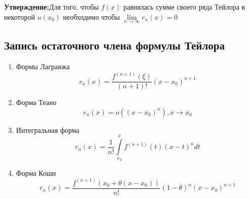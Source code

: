 \documentclass[12pt]{article}
\let\oldint\int
\let\oldlim\lim
\renewcommand{\int}{\oldint\limits}
\renewcommand{\lim}{\oldlim\limits}
\begin{document}
    \textbf{Утверждение:}Для того, чтобы $f(x)$ равнялась сумме своего ряда Тейлора в некоторой
    $u(x_0)$ необходимо чтобы $\lim_{n \to \infty}r_n(x)=0$

    \subsection*{Запись остаточного члена формулы Тейлора}
    \begin{enumerate}
      \item Формы Лагранжа
      \[r_n(x)=\frac{f^{(n+1)}(\xi)}{(n+1)!}(x-x_0)^{n+1}\]
      \item Форма Теано
      \[r_n(x)=o((x-x_0)^n), x \to x_0\]
      \item Интегральная форма
      \[r_n(x)=\frac{1}{n!}\int_{x_0}^{x}f^{(n+1)}(t)(x-t)^ndt\]
      \item Форма Коши
      \[r_n(x)=\dfrac{f^{(n+1)}(x_0+\theta(x-x_0))}{n!}(1-\theta)^n(x-x_0)^{n+1}\]
    \end{enumerate}
\end{document}
